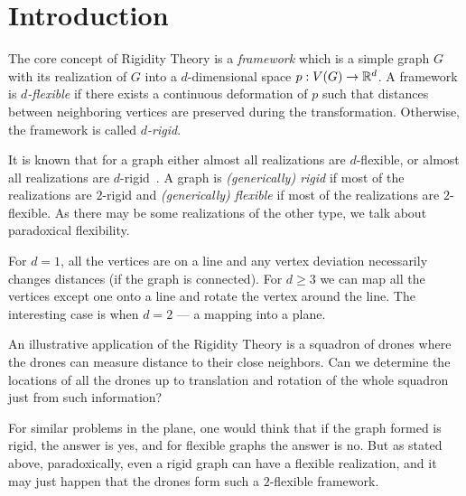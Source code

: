 
\chapter{Introduction}
\setcounter{page}{1}


The core concept of Rigidity Theory is a \emph{framework} which is
a simple graph \(G\) with its realization of \(G\)
into a \(d\)-dimensional space \(p: V(G) \to \mathbb{R}^d\).
A framework is \emph{\( d \)-flexible} if there exists
a continuous deformation of \( p \) such that
distances between neighboring vertices are preserved during the transformation.
Otherwise, the framework is called \emph{\( d \)-rigid}.

It is known that for a graph either almost all realizations are \( d \)-flexible,
or almost all realizations are \( d \)-rigid~\cite{generically_rigid_graphs}.
A graph is \emph{(generically) rigid} if most of the realizations are \( 2 \)-rigid
and \emph{(generically) flexible} if most of the realizations are \( 2 \)-flexible.
As there may be some realizations of the other type,
we talk about paradoxical flexibility.

For \( d = 1 \), all the vertices are on a line
and any vertex deviation necessarily changes distances (if the graph is connected).
%
For \( d \ge 3 \) we can map all the vertices except one onto a line and
rotate the vertex around the line.
%
The interesting case is when \( d = 2 \) --- a mapping into a plane.

An illustrative application of the Rigidity Theory is a squadron of drones
where the drones can measure distance to their close neighbors.
Can we determine the locations of all the drones
up to translation and rotation of the whole squadron
just from such information?

For similar problems in the plane,
one would think that if the graph formed is rigid, the answer is yes, and
for flexible graphs the answer is no.
But as stated above, paradoxically, even a rigid graph can have a flexible realization,
and it may just happen that the drones form such a \( 2 \)-flexible framework.

